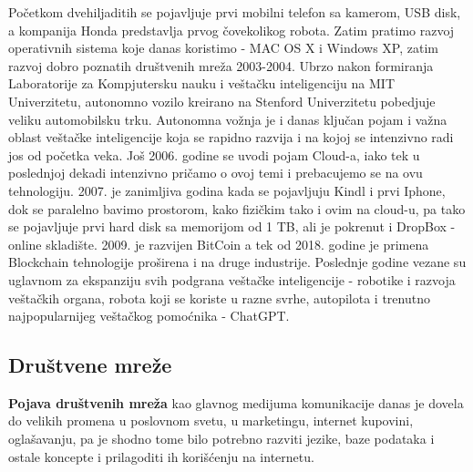 \documentclass[a4paper]{article}
\begin{document}
{Početkom dvehiljaditih se pojavljuje prvi mobilni telefon sa kamerom, USB disk, a kompanija Honda predstavlja prvog čovekolikog robota. Zatim pratimo razvoj operativnih sistema koje danas koristimo - MAC OS X i Windows XP, zatim razvoj dobro poznatih društvenih mreža 2003-2004. Ubrzo nakon formiranja Laboratorije za Kompjutersku nauku i veštačku inteligenciju na MIT Univerzitetu, autonomno vozilo kreirano na Stenford Univerzitetu pobedjuje veliku automobilsku trku. Autonomna vožnja je i danas ključan pojam i važna oblast veštačke inteligencije koja se rapidno razvija i na kojoj se intenzivno radi jos od početka veka. Još 2006. godine se uvodi pojam Cloud-a, iako tek u poslednjoj dekadi intenzivno pričamo o ovoj temi i prebacujemo se na ovu tehnologiju. 2007. je zanimljiva godina kada se pojavljuju Kindl i prvi Iphone, dok se paralelno bavimo prostorom, kako fizičkim tako i ovim na cloud-u, pa tako se pojavljuje prvi hard disk sa memorijom od 1 TB, ali je pokrenut i DropBox - online skladište. 2009. je razvijen BitCoin a tek od 2018. godine je primena Blockchain tehnologije proširena i na druge industrije. Poslednje godine vezane su uglavnom za ekspanziju svih podgrana veštačke inteligencije - robotike i razvoja veštačkih organa, robota koji se koriste u razne svrhe, autopilota i trenutno najpopularnijeg veštačkog pomoćnika - ChatGPT.

\setlength{\parskip}{1em}



\subsection{Društvene mreže}
{\bf Pojava društvenih mreža} kao glavnog medijuma komunikacije danas je dovela do velikih promena u poslovnom svetu, u marketingu, internet kupovini, oglašavanju, pa je shodno tome bilo potrebno razviti jezike, baze podataka i ostale koncepte i prilagoditi ih korišćenju na internetu. 

}
\end{document}
